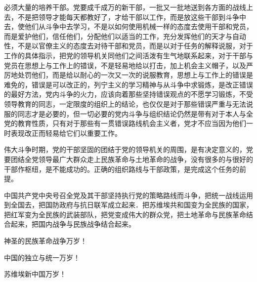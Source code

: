 必须大量的培养干部。党要成千成万的新干部，一批又一批地送到各方面的战线上去，不是把领导才能每天都教好了，才给干部以工作，而是放这些干部到斗争中去，使他们从斗争中去学习，不是以如何使用机械一样的态度去使用干部和党员，而是爱护他们，信任他们，分配他们以适当的工作，充分发挥他们的天才与自动性，不是以官僚主义的态度去对待干部和党员，而是以对于任务的解释说服，对于工作的具体指示，把党的领导机关同他们之间活泼有生气地联系起来，对于干部与党员在思想上与工作上的错误，不是轻易地给以打击，加上机会主义帽子，以及严厉地处罚他们，而是给以耐心的一次又一次的说服教育，思想上与工作上的错误是难免的，错误是可以改正的，列宁主义的学习精神与从斗争中求锻炼，是改正错误的最好方法，党内斗争的火力，应该向着那些坚持错误观点的不愿学习锻炼，不受领导教育的同志，一定限度的组织上的结论，也仅仅是对于那些错误严重与无法说服的同志才是必要的，但一切必要的党内斗争与组织结论仍然是带有对于本人与全党的教育性质，只有对于那些有一贯错误路线机会主义者，党才不应当因为他们一时表现改正而轻易给它们以重要工作。

伟大斗争时期，党的干部坚固的团结于党的领导机关的周围，是有决定意义的，党要团结全党领导最广大群众走上民族革命与土地革命的战争，没有很多的与很好的干部作枢纽，是不能成功的。正确的组织路线与干部政策，是完成这个任务的前提。

中国共产党中央号召全党及其干部坚持执行党的策略路线而斗争，把统一战线运用到全国去，把国防政府与抗日联军成立起来．把苏维埃共和国变为全民族的国家，把红军变为全民族的武装部队，把党变成伟大的群众党，把土地革命与民族革命结合起来，把国内战争与民族战争结合起来。

神圣的民族革命战争万岁！

中国的独立与统一万岁！

苏维埃新中国万岁！

